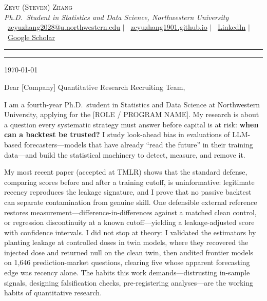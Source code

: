 \documentclass[10.5pt]{article}
\begin{document}
\begin{center}
  {\Huge\scshape Zeyu (Steven) Zhang}\\[6pt]
  {\color{metagray}\itshape Ph.D.\ Student in Statistics and Data Science, Northwestern University}\\[6pt]
  {\small
    \faEnvelope\ \href{mailto:zeyuzhang2028@u.northwestern.edu}{zeyuzhang2028@u.northwestern.edu}
    \;$|$\;
    \faGlobe\ \href{https://zeyuzhang1901.github.io}{zeyuzhang1901.github.io}
    \;$|$\;
    \faLinkedin\ \href{https://www.linkedin.com/in/zeyu-zhang-42813a271/}{LinkedIn}
    \;$|$\;
    \faGraduationCap\ \href{https://scholar.google.com/citations?user=dr-xetEAAAAJ}{Google Scholar}
  }\\[4pt]
  {\color{accent}\rule[0.6pt]{2.4cm}{1.6pt}}{\color{rulegray}\rule[1.15pt]{\dimexpr\textwidth-2.4cm\relax}{0.5pt}}
\end{center}

\vspace{4pt}
{\color{metagray}\today}

Dear [Company] Quantitative Research Recruiting Team,

I am a fourth-year Ph.D.\ student in Statistics and Data Science at Northwestern
University, applying for the [ROLE / PROGRAM NAME]. My research is about a question
every systematic strategy must answer before capital is at risk: \textbf{when can a
backtest be trusted?} I study look-ahead bias in evaluations of LLM-based
forecasters---models that have already ``read the future'' in their training
data---and build the statistical machinery to detect, measure, and remove it.

My most recent paper (accepted at TMLR) shows that the standard defense,
comparing scores before and after a training cutoff, is uninformative: legitimate
recency reproduces the leakage signature, and I prove that no passive backtest can
separate contamination from genuine skill. One defensible external reference
restores measurement---difference-in-differences against a matched clean control,
or regression discontinuity at a known cutoff---yielding a leakage-adjusted score
with confidence intervals. I did not stop at theory: I validated the estimators by
planting leakage at controlled doses in twin models, where they recovered the
injected dose and returned null on the clean twin, then audited frontier models on
1{,}646 prediction-market questions, clearing five whose apparent forecasting edge
was recency alone. The habits this work demands---distrusting in-sample signals,
designing falsification checks, pre-registering analyses---are the working habits
of quantitative research.
\end{document}

